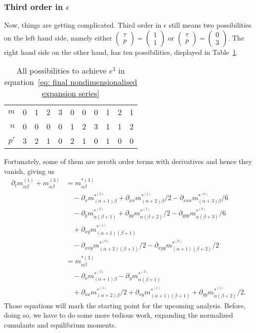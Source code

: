 \subsubsection{Third order in \texorpdfstring{$\epsilon$}{epsilon}}
\label{subs: Third order in epsilon}
Now, things are getting complicated.
Third order in $\epsilon$ still means two possibilities on the left hand side, namely either $\begin{pmatrix}\tau \\ p\end{pmatrix} = \begin{pmatrix} 1 \\ 1 \end{pmatrix}$ or $\begin{pmatrix}\tau \\ p\end{pmatrix} = \begin{pmatrix} 0 \\ 3 \end{pmatrix}$.
The right hand side on the other hand, has ten possibilities, displayed in Table~\ref{table: third order epsilon}.
\begin{table}[h]
  \centering
  \begin{tabular} {r || c | *{3}{c} | *{3}{c} | *{3}{c} }
    $m$  & 0 & 1 & 2 & 3 & 0 & 0 & 0 & 1 & 2 & 1 \\
    $n$  & 0 & 0 & 0 & 0 & 1 & 2 & 3 & 1 & 1 & 2 \\
    $p'$ & 3 & 2 & 1 & 0 & 2 & 1 & 0 & 1 & 0 & 0
  \end{tabular}
  \caption{All possibilities to achieve $\epsilon^3$ in equation~\eqref{eq: final nondimensionalised expansion series}}
\label{table: third order epsilon}
\end{table}
Fortunately, some of them are zeroth order terms with derivatives and hence they vanish, giving us
\begin{equation}
  \label{eq: third order in epsilon}
  \begin{aligned}
    \partial_t m_{\alpha\beta}^{(1)} + m_{\alpha\beta}^{(3)}
    & =  m_{\alpha\beta}^{*(3)} \\
    &\quad - \partial_x m_{(\alpha+1)\beta}^{*^{(2)}} + \partial_{xx} m_{(\alpha+2)\beta}^{*^{(1)}}/2 - \partial_{xxx} m_{(\alpha+3)\beta}^{*^{(0)}}/6 \\
    &\quad - \partial_y m_{\alpha(\beta+1)}^{*^{(2)}} + \partial_{yy} m_{\alpha(\beta+2)}^{*^{(1)}}/2 - \partial_{yyy} m_{\alpha(\beta+3)}^{*^{(0)}}/6 \\
    &\quad + \partial_{xy} m_{(\alpha+1)(\beta+1)}^{*^{(1)}} \\
    &\quad - \partial_{xxy} m_{(\alpha+2)(\beta+1)}^{*^{(0)}}/2 - \partial_{xyy} m_{(\alpha+1)(\beta+2)}^{*^{(0)}}/2 \\
    & =  m_{\alpha\beta}^{*(3)} \\
    &\quad - \partial_x m_{(\alpha+1)\beta}^{*^{(2)}} - \partial_y m_{\alpha(\beta+1)}^{*^{(2)}}  \\
    &\quad  + \partial_{xx} m_{(\alpha+2)\beta}^{*^{(1)}}/2 + \partial_{xy} m_{(\alpha+1)(\beta+1)}^{*^{(1)}} + \partial_{yy} m_{\alpha(\beta+2)}^{*^{(1)}}/2.
  \end{aligned}
\end{equation}
Those equations will mark the starting point for the upcoming analysis.
Before, doing so, we have to do some more tedious work, expanding the normalized cumulants and equilibrium moments.
